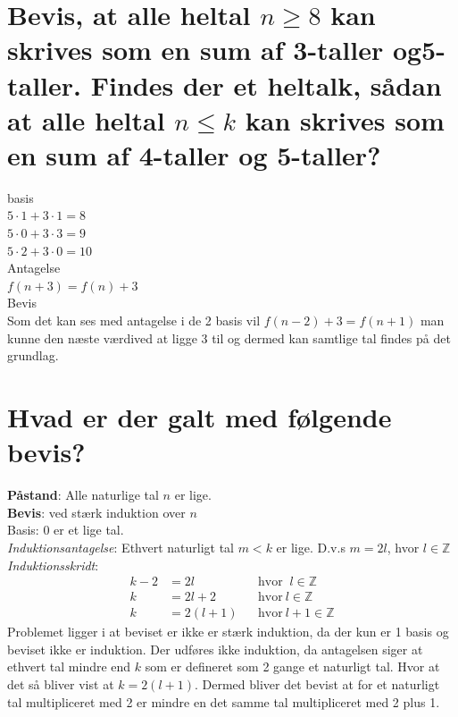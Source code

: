 \documentclass[12pt, a4paper]{report}
\begin{document}
			\section{Bevis, at alle heltal $n\geq 8$ kan skrives som en sum af 3-taller og5-taller. Findes der et heltalk, sådan at alle heltal $n\leq k$ kan skrives som en sum af 4-taller og 5-taller?}
				basis\\ 
				$5\cdot 1 +3\cdot 1 = 8$\\
				$5\cdot 0 + 3\cdot 3 = 9$\\
				$5\cdot 2 + 3\cdot 0 = 10$\\
				Antagelse\\
				$f(n+3)=f(n)+3$\\
				Bevis\\
				Som det kan ses med antagelse i de 2 basis vil $f(n-2)+3=f(n+1)$ man kunne den næste værdived at ligge 3 til og dermed kan samtlige tal findes på det grundlag.
			\section{Hvad er der galt med følgende bevis?}
				\textbf{Påstand}: Alle naturlige tal $n$ er lige.\\
				\textbf{Bevis}: ved stærk induktion over $n$\\
				Basis: 0 er et lige tal.\\
				\emph{Induktionsantagelse}: Ethvert naturligt tal $m<k$ er lige. D.v.s $m=2l$, hvor $l\in \mathbb{Z}$\\
				\emph{Induktionsskridt}:\\
				\begin{align*}
					k-2&=2l&&\text{hvor }\: l\in\mathbb{Z}\\
					k&=2l+2&&\text{hvor}\: l\in\mathbb{Z}\\
					k&=2(l+1)&&\text{hvor}\: l+1\in\mathbb{Z}
				\end{align*}
				Problemet ligger i at beviset er ikke er stærk induktion, da der kun er 1 basis og beviset ikke er induktion. Der udføres ikke induktion, da antagelsen siger at ethvert tal mindre end $k$ som er defineret som 2 gange et naturligt tal. Hvor at det så bliver vist at $k=2(l+1)$. Dermed bliver det bevist at for et naturligt tal multipliceret med 2 er mindre en det samme tal multipliceret med 2 plus 1.
			\setcounter{section}{0}
\end{document}
